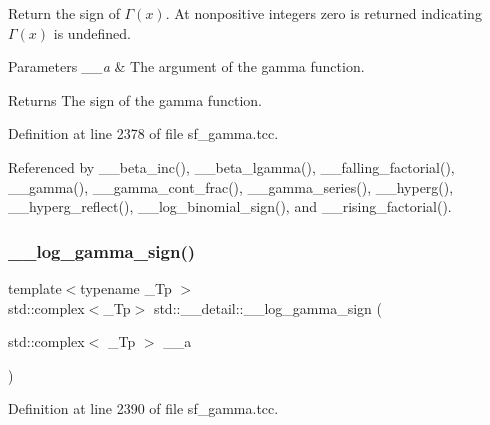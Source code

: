 Return the sign of $ \Gamma(x) $. At nonpositive integers zero is returned indicating $ \Gamma(x) $ is undefined. 


\begin{DoxyParams}{Parameters}
{\em \+\_\+\+\_\+a} & The argument of the gamma function. \\
\hline
\end{DoxyParams}
\begin{DoxyReturn}{Returns}
The sign of the gamma function. 
\end{DoxyReturn}


Definition at line 2378 of file sf\+\_\+gamma.\+tcc.



Referenced by \+\_\+\+\_\+beta\+\_\+inc(), \+\_\+\+\_\+beta\+\_\+lgamma(), \+\_\+\+\_\+falling\+\_\+factorial(), \+\_\+\+\_\+gamma(), \+\_\+\+\_\+gamma\+\_\+cont\+\_\+frac(), \+\_\+\+\_\+gamma\+\_\+series(), \+\_\+\+\_\+hyperg(), \+\_\+\+\_\+hyperg\+\_\+reflect(), \+\_\+\+\_\+log\+\_\+binomial\+\_\+sign(), and \+\_\+\+\_\+rising\+\_\+factorial().

\mbox{\label{namespacestd_1_1____detail_a4c87b679d9fa1ac20ebe3cb85becb266}} 
\subsubsection{\texorpdfstring{\+\_\+\+\_\+log\+\_\+gamma\+\_\+sign()}{\_\_log\_gamma\_sign()}\hspace{0.1cm}{\footnotesize\ttfamily [2/2]}}
{\footnotesize\ttfamily template$<$typename \+\_\+\+Tp $>$ \\
std\+::complex$<$\+\_\+\+Tp$>$ std\+::\+\_\+\+\_\+detail\+::\+\_\+\+\_\+log\+\_\+gamma\+\_\+sign (\begin{DoxyParamCaption}\item[{std\+::complex$<$ \+\_\+\+Tp $>$}]{\+\_\+\+\_\+a }\end{DoxyParamCaption})}



Definition at line 2390 of file sf\+\_\+gamma.\+tcc.

\mbox{\label{namespacestd_1_1____detail_a48998bae6619c9f63574af354b205074}} 
